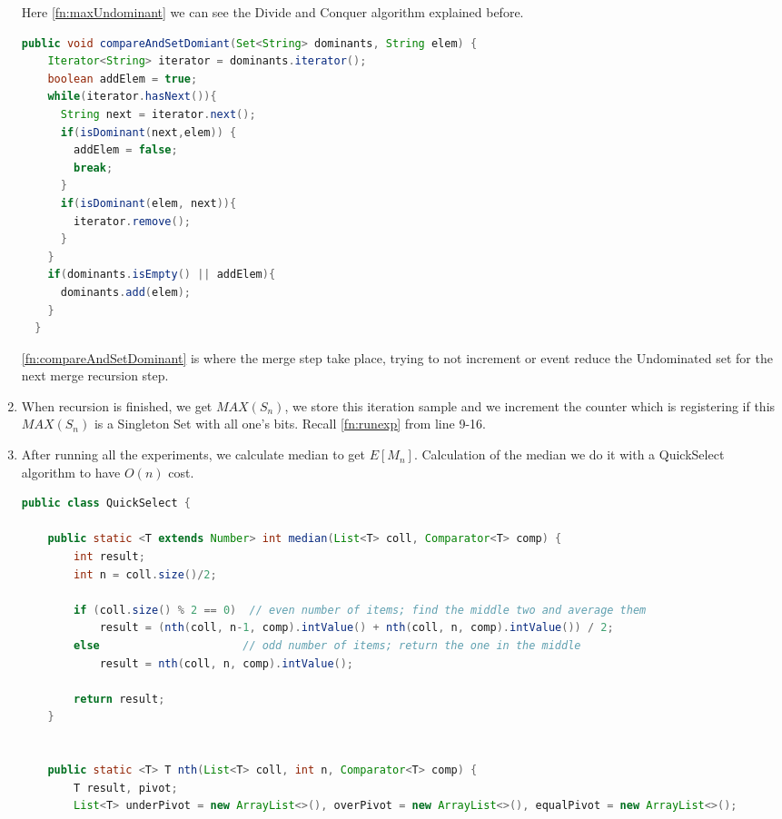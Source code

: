 \documentclass[12pt, a4paper]{article}
\begin{document}
\begin{enumerate}
Here \ref{fn:maxUndominant} we can see the Divide and Conquer algorithm
explained before. 

\begin{lstlisting}[language=Java,caption={compareAndSetDominant function},label={fn:compareAndSetDominant}]
  public void compareAndSetDomiant(Set<String> dominants, String elem) {
    Iterator<String> iterator = dominants.iterator();
    boolean addElem = true;
    while(iterator.hasNext()){
      String next = iterator.next();
      if(isDominant(next,elem)) {
        addElem = false;
        break;
      }
      if(isDominant(elem, next)){
        iterator.remove();
      }
    }
    if(dominants.isEmpty() || addElem){
      dominants.add(elem);
    }
  }
\end{lstlisting}

\ref{fn:compareAndSetDominant} is where the merge step
take place, trying to not increment or event reduce the Undominated set for the
next merge recursion step.

\item When recursion is finished, we get $MAX(S_n)$, we store this iteration
  sample and we increment the counter which is registering if this $MAX(S_n)$ is
  a Singleton Set with all one's bits. Recall \ref{fn:runexp} from line 9-16.

\item After running all the experiments, we calculate median to get $E[M_n]$.
  Calculation of the median we do it with a QuickSelect algorithm to have $O(n)$
  cost.

\begin{lstlisting}[language=Java,caption={QuickSelect Algorithm},label={fn:quickselect}]
public class QuickSelect {

    public static <T extends Number> int median(List<T> coll, Comparator<T> comp) {
        int result;
        int n = coll.size()/2;

        if (coll.size() % 2 == 0)  // even number of items; find the middle two and average them
            result = (nth(coll, n-1, comp).intValue() + nth(coll, n, comp).intValue()) / 2;
        else                      // odd number of items; return the one in the middle
            result = nth(coll, n, comp).intValue();

        return result;
    }


    public static <T> T nth(List<T> coll, int n, Comparator<T> comp) {
        T result, pivot;
        List<T> underPivot = new ArrayList<>(), overPivot = new ArrayList<>(), equalPivot = new ArrayList<>();


\end{lstlisting}
\end{enumerate}
\end{document}
